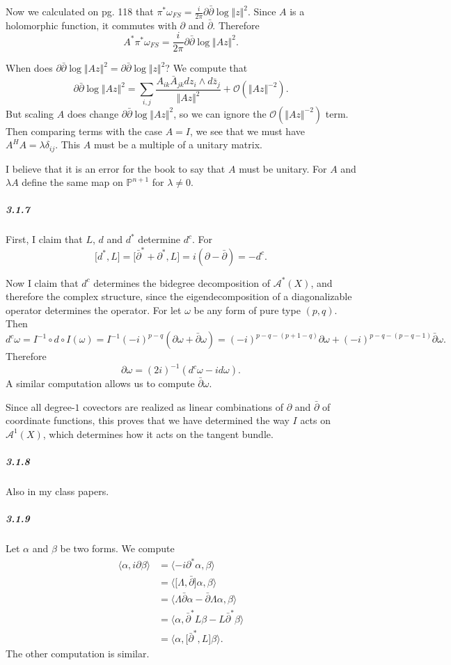 \documentclass[10pt,letter]{article}
\begin{document}
Now we calculated on pg. 118 that $\pi^{\ast} \omega_{FS}= \frac{i}{2\pi} \partial \bar{\partial} \log \Vert z \Vert^2$. Since $A$ is a holomorphic function, it commutes with $\partial$ and $\bar{\partial}$. Therefore \[ A^{\ast}  \pi^{\ast} \omega_{FS} =  \frac{i}{2\pi} \partial \bar{\partial} \log \Vert Az \Vert^2.\]

When does $\partial \bar{\partial} \log \Vert Az \Vert^2 = \partial \bar{\partial} \log \Vert z \Vert^2$? We compute that
\[ \partial \bar{\partial}\log \Vert Az \Vert^2 = \sum_{i,j} \frac{A_{ik}\bar{A}_{jk} dz_i \wedge d\bar{z}_j}{\Vert Az \Vert^2} + \mathcal{O}(\Vert Az \Vert^{-2}).\]
But scaling $A$ does change $\partial \bar{\partial} \log \Vert Az \Vert^2$, so we can ignore the $\mathcal{O}(\Vert Az \Vert^{-2})$ term. Then comparing terms with the case $A = I$, we see that we must have $A^HA = \lambda \delta_{ij}$. This $A$ must be a multiple of a unitary matrix. 

I believe that it is an error for the book to say that $A$ must be unitary. For $A$ and $\lambda A$ define the same map on $\mathbb{P}^{n+1}$ for $\lambda \neq 0$. 

\subparagraph{3.1.7} First, I claim that $L$, $d$ and $d^{\ast}$ determine $d^c$. For 
\[ \lbrack d^{\ast},L \rbrack =  \lbrack \bar{\partial}^{\ast} + \partial^{\ast},L \rbrack = i(\partial - \bar{\partial}) = -d^c.\]

Now I claim that $d^c$ determines the bidegree decomposition of $\mathcal{A}^{\ast}(X)$, and therefore the complex structure, since the eigendecomposition of a diagonalizable operator determines the operator. For let $\omega$ be any form of pure type $(p,q)$. Then \[ d^c \omega = I^{-1} \circ d \circ I(\omega) = I^{-1} (-i)^{p-q} (\partial\omega + \bar{\partial}{\omega}) = (-i)^{p-q-(p+1-q)}\partial\omega  + (-i)^{p-q-(p-q-1)}\bar{\partial}\omega.\]
Therefore \[ \partial \omega = (2i)^{-1}(d^c\omega - i d \omega).\] A similar computation allows us to compute $\bar\partial \omega$. 

Since all degree-$1$ covectors are realized as linear combinations of $\partial$ and $\bar \partial$ of coordinate functions, this proves that we have determined the way $I$ acts on $\mathcal{A}^1(X)$, which determines how it acts on the tangent bundle. 

\subparagraph{3.1.8} Also in my class papers.
\subparagraph{3.1.9} Let $\alpha$ and $\beta$ be two forms. We compute
\begin{align*}
\langle \alpha, i\partial \beta \rangle &=
\langle -i \partial^{\ast} \alpha, \beta \rangle \\ &= \langle\lbrack \Lambda, \bar{\partial} \rbrack \alpha, \beta \rangle \\ 
&= \langle \Lambda \bar{\partial} \alpha - \bar{\partial} \Lambda  \alpha, \beta \rangle \\
&= \langle  \alpha, \bar {\partial}^{\ast} L  \beta -   L \bar {\partial}^{\ast}   \beta   \rangle \\
&= \langle \alpha, \lbrack  \bar{\partial}^{\ast},L \rbrack  \beta \rangle.
\end{align*} 
The other computation is similar. 
\end{document}

